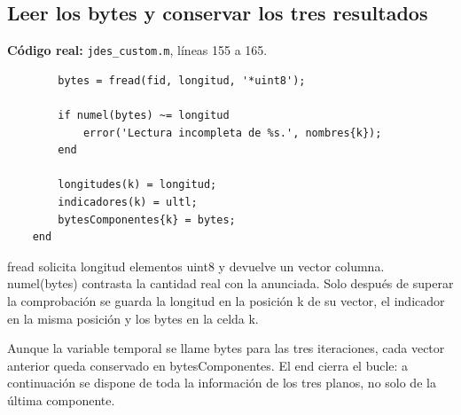 \documentclass[11pt,a4paper,oneside]{report}
\begin{document}
\par\medskip\noindent\begin{minipage}{\linewidth}

\subsection{Leer los bytes y conservar los tres resultados}

\textbf{Código real:} \texttt{jdes\_custom.m}, líneas 155 a 165.

\begin{lstlisting}[firstnumber=155]
        % Leer los bytes empaquetados.
        bytes = fread(fid, longitud, '*uint8');

        if numel(bytes) ~= longitud
            error('Lectura incompleta de %s.', nombres{k});
        end

        longitudes(k) = longitud;
        indicadores(k) = ultl;
        bytesComponentes{k} = bytes;
    end
\end{lstlisting}

\end{minipage}\par


fread solicita longitud elementos uint8 y devuelve un vector columna.
numel(bytes) contrasta la cantidad real con la anunciada. Solo después de
superar la comprobación se guarda la longitud en la posición k de su vector,
el indicador en la misma posición y los bytes en la celda k.

Aunque la variable temporal se llame bytes para las tres iteraciones,
cada vector anterior queda conservado en bytesComponentes. El end cierra
el bucle: a continuación se dispone de toda la información de los tres planos,
no solo de la última componente.
\end{document}
